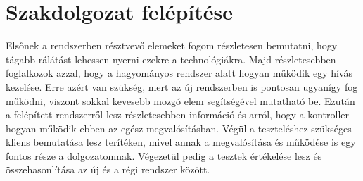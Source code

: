 \section{Szakdolgozat felépítése}

Elsőnek a rendszerben résztvevő elemeket fogom részletesen bemutatni, hogy 
tágabb rálátást lehessen nyerni ezekre a technológiákra. Majd részletesebben 
foglalkozok azzal, hogy a hagyományos rendszer alatt hogyan működik egy hívás 
kezelése. Erre azért van szükség, mert az új rendszerben is pontosan ugyanígy fog 
működni, viszont sokkal kevesebb mozgó elem segítségével mutatható be. 
Ezután a felépített rendszerről lesz részletesebben információ és arról, hogy a
kontroller hogyan működik ebben az egész megvalósításban. 
Végül a teszteléshez szükséges kliens bemutatása lesz terítéken, mivel annak a 
megvalósítása és működése is egy fontos része a dolgozatomnak. Végezetül pedig 
a tesztek értékelése lesz és összehasonlítása az új és a régi rendszer között. 